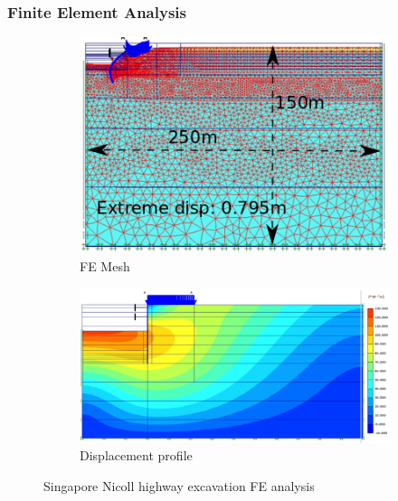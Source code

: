 \documentclass[notes]{beamer}
\begin{document}
\begin{frame}
\frametitle{Finite Element Analysis}
\begin{figure}[ht]
	\centering
	\begin{subfigure}[b]{0.4\linewidth}
		\centering
		\includegraphics[width=\textwidth]{figs/fea-geotech-mesh.png}
		\caption{FE Mesh}
	\end{subfigure}%
	\begin{subfigure}[b]{0.6\linewidth}
		\centering
		\includegraphics[width=\textwidth]{figs/fea-geotech.png}
		\caption{Displacement profile}
	\end{subfigure}
	\caption*{Singapore Nicoll highway excavation FE analysis}
\end{figure}
\end{frame}
\end{document}
